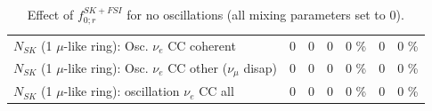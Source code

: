 \begin{table}
\begin{tabular}{| l | r | r | r  r | r  r |}
                          $N_{SK}$ (1 $\mu$-like ring): Osc. $\nu_e$ CC coherent &               0 &               0 &               0 &        0 \%  &               0 &        0 \%  \\ 
           $N_{SK}$ (1 $\mu$-like ring): Osc. $\nu_e$ CC other ($\nu_\mu$ disap) &               0 &               0 &               0 &        0 \%  &               0 &        0 \%  \\ 
                        $N_{SK}$ (1 $\mu$-like ring): oscillation $\nu_e$ CC all &               0 &               0 &               0 &        0 \%  &               0 &        0 \%  \\ 
\hline
\hline
\end{tabular}
\caption{ Effect of $f_{0; r}^{SK+FSI}$ for no oscillations (all mixing parameters set to 0). }
\label{tab:num_skdetfsi_000_1RmuT_3f_osc_t13:0_spectralreco_spectraltrue}
\end{table}
\clearpage

